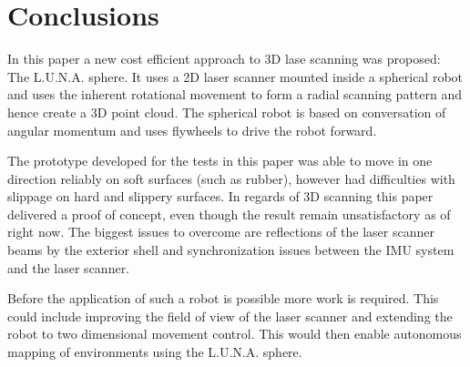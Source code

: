 \section{Conclusions}
\label{sec:conclusions}

In this paper a new cost efficient approach to 3D lase scanning was proposed: The L.U.N.A. sphere. It uses a 2D laser scanner mounted inside a spherical robot and uses the inherent rotational movement to form a radial scanning pattern and hence create a 3D point cloud. The spherical robot is based on conversation of angular momentum and uses flywheels to drive the robot forward. 

The prototype developed for the tests in this paper was able to move in one direction reliably on soft surfaces (such as rubber), however had difficulties with slippage on hard and slippery surfaces. In regards of 3D scanning this paper delivered a proof of concept, even though the result remain unsatisfactory as of right now. The biggest issues to overcome are reflections of the laser scanner beams by the exterior shell and synchronization issues between the IMU system and the laser scanner. 

Before the application of such a robot is possible more work is required. This could include improving the field of view of the laser scanner and extending the robot to two dimensional movement control. This would then enable autonomous mapping of environments using the L.U.N.A. sphere. 
